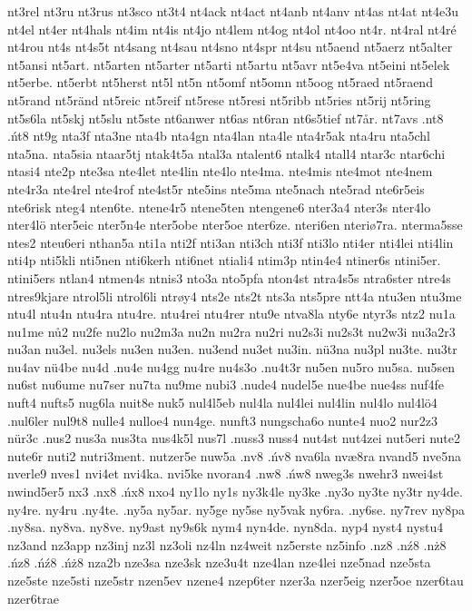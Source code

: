 {{nt3rel
nt3ru
nt3rus
nt3sco
nt3t4
nt4ack
nt4act
nt4anb
nt4anv
nt4as
nt4at
nt4e3u
nt4el
nt4er
nt4hals
nt4im
nt4is
nt4jo
nt4lem
nt4og
nt4ol
nt4oo
nt4r.
nt4ral
nt4ré
nt4rou
nt4s
nt4s5t
nt4sang
nt4sau
nt4sno
nt4spr
nt4su
nt5aend
nt5aerz
nt5alter
nt5ansi
nt5art.
nt5arten
nt5arter
nt5arti
nt5artu
nt5avr
nt5e4va
nt5eini
nt5elek
nt5erbe.
nt5erbt
nt5herst
nt5l
nt5n
nt5omf
nt5omn
nt5oog
nt5raed
nt5raend
nt5rand
nt5ränd
nt5reic
nt5reif
nt5rese
nt5resi
nt5ribb
nt5ries
nt5rij
nt5ring
nt5s6la
nt5skj
nt5slu
nt5ste
nt6anwer
nt6as
nt6ran
nt6s5tief
nt7år.
nt7avs
.nt8
.ńt8
nt9g
nta3f
nta3ne
nta4b
nta4gn
nta4lan
nta4le
nta4r5ak
nta4ru
nta5chl
nta5na.
nta5sia
ntaar5tj
ntak4t5a
ntal3a
ntalent6
ntalk4
ntall4
ntar3c
ntar6chi
ntasi4
nte2p
nte3sa
nte4let
nte4lin
nte4lo
nte4ma.
nte4mis
nte4mot
nte4nem
nte4r3a
nte4rel
nte4rof
nte4st5r
nte5ins
nte5ma
nte5nach
nte5rad
nte6r5eis
nte6risk
nteg4
nten6te.
ntene4r5
ntene5ten
ntengene6
nter3a4
nter3s
nter4lo
nter4lö
nter5eic
nter5n4e
nter5obe
nter5oe
nter6ze.
nteri6en
nteriø7ra.
nterma5sse
ntes2
nteu6eri
nthan5a
nti1a
nti2f
nti3an
nti3ch
nti3f
nti3lo
nti4er
nti4lei
nti4lin
nti4p
nti5kli
nti5nen
nti6kerh
nti6net
ntiali4
ntim3p
ntin4e4
ntiner6s
ntini5er.
ntini5ers
ntlan4
ntmen4s
ntnis3
nto3a
nto5pfa
nton4st
ntra4s5s
ntra6ster
ntre4s
ntres9kjare
ntrol5li
ntrol6li
ntrøy4
nts2e
nts2t
nts3a
nts5pre
ntt4a
ntu3en
ntu3me
ntu4l
ntu4n
ntu4ra
ntu4re.
ntu4rei
ntu4rer
ntu9e
ntva8la
nty6e
ntyr3s
ntz2
nu1a
nu1me
nů2
nu2fe
nu2lo
nu2m3a
nu2n
nu2ra
nu2ri
nu2s3i
nu2s3t
nu2w3i
nu3a2r3
nu3an
nu3el.
nu3els
nu3en
nu3en.
nu3end
nu3et
nu3in.
nü3na
nu3pl
nu3te.
nu3tr
nu4av
nü4be
nu4d
.nu4e
nu4gg
nu4re
nu4s3o
.nu4t3r
nu5en
nu5ro
nu5sa.
nu5sen
nu6st
nu6ume
nu7ser
nu7ta
nu9me
nubi3
.nude4
nudel5e
nue4be
nue4ss
nuf4fe
nuft4
nufts5
nug6la
nuit8e
nuk5
nul4l5eb
nul4la
nul4lei
nul4lin
nul4lo
nul4lö4
.nul6ler
nul9t8
nulle4
nulloe4
nun4ge.
nunft3
nungscha6o
nunte4
nuo2
nur2z3
nür3c
.nus2
nus3a
nus3ta
nus4k5l
nus7l
.nuss3
nuss4
nut4st
nut4zei
nut5eri
nute2
nute6r
nuti2
nutri3ment.
nutzer5e
nuw5a
.nv8
.ńv8
nva6la
nvæ8ra
nvand5
nve5na
nverle9
nves1
nvi4et
nvi4ka.
nvi5ke
nvoran4
.nw8
.ńw8
nweg3s
nwehr3
nwei4st
nwind5er5
nx3
.nx8
.ńx8
nxo4
ny1lo
ny1s
ny3k4le
ny3ke
.ny3o
ny3te
ny3tr
ny4de.
ny4re.
ny4ru
.ny4te.
.ny5a
ny5ar.
ny5ge
ny5se
ny5vak
ny6ra.
.ny6se.
ny7rev
ny8pa
.ny8sa.
ny8va.
ny8ve.
ny9ast
ny9s6k
nym4
nyn4de.
nyn8da.
nyp4
nyst4
nystu4
nz3and
nz3app
nz3inj
nz3l
nz3oli
nz4ln
nz4weit
nz5erste
nz5info
.nz8
.nź8
.nż8
.ńz8
.ńź8
.ńż8
nza2b
nze3sa
nze3sk
nze3u4t
nze4lan
nze4lei
nze5nad
nze5sta
nze5ste
nze5sti
nze5str
nzen5ev
nzene4
nzep6ter
nzer3a
nzer5eig
nzer5oe
nzer6tau
nzer6trae
}}
